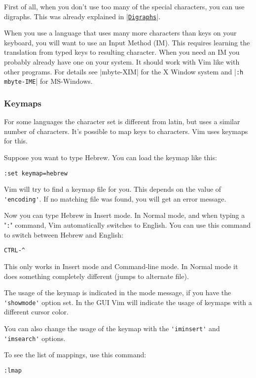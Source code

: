 First of all, when you don't use too many of the special characters, you can use digraphs.
This was already explained in |\hyperref[Digraphs]{\texttt{Digraphs}}|.

When you use a language that uses many more characters than keys on your keyboard, you will want to use an Input Method (IM).
This requires learning the translation from typed keys to resulting character.
When you need an IM you probably already have one on your system.
It should work with Vim like with other programs.
For details see |mbyte-XIM| for the X Window system and |\verb!:h mbyte-IME!| for MS-Windows.

\subsubsection{Keymaps}
For some languages the character set is different from latin, but uses a similar number of characters.
It's possible to map keys to characters.
Vim uses keymaps for this.

Suppose you want to type Hebrew.
You can load the keymap like this:

\begin{Verbatim}[samepage=true]
 :set keymap=hebrew
\end{Verbatim}

Vim will try to find a keymap file for you.
This depends on the value of \verb!'encoding'!.
If no matching file was found, you will get an error message.

Now you can type Hebrew in Insert mode.
In Normal mode, and when typing a "\verb!:!" command, Vim automatically switches to English.
You can use this command to switch between Hebrew and English:

\begin{Verbatim}[samepage=true]
 CTRL-^
\end{Verbatim}

This only works in Insert mode and Command-line mode.
In Normal mode it does something completely different (jumps to alternate file).

The usage of the keymap is indicated in the mode message, if you have the \verb!'showmode'! option set.
In the GUI Vim will indicate the usage of keymaps with a different cursor color.

You can also change the usage of the keymap with the \verb!'iminsert'! and \verb!'imsearch'! options.

To see the list of mappings, use this command:

\begin{Verbatim}[samepage=true]
 :lmap
\end{Verbatim}

